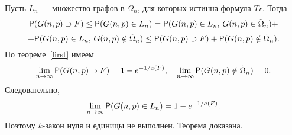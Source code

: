 \documentclass[12pt,a4paper,russian,titlepage]{article}
\begin{document}





Пусть $L_n$ --- множество графов в $\Omega_n$, для которых истинна формула $Tr$. Тогда
$$
 {\sf P}(G(n,p)\supset F)\leq {\sf P}(G(n,p)\in L_n)=
 {\sf P}(G(n,p)\in L_n,\,G(n,p)\in\tilde\Omega_n)+
$$
$$
 +{\sf P}(G(n,p)\in L_n,\,G(n,p)\notin\tilde\Omega_n)\leq
 {\sf P}(G(n,p)\supset F)+
 {\sf P}(G(n,p)\notin\tilde\Omega_n).
$$
По теореме~\ref{first} имеем
$$
 \lim\limits_{n\rightarrow\infty}{\sf P}(G(n,p)\supset F)=1 - e^{-1/a(F)},\quad
 \lim\limits_{n\rightarrow\infty}{\sf P}(G(n,p)\notin\tilde\Omega_n)=0.
$$
Следовательно,
$$
\lim\limits_{n\rightarrow\infty}{\sf P}(G(n,p)\in L_n) = 1 - e^{-1/a(F)}.
$$
Поэтому $k$-закон нуля и единицы не выполнен. Теорема доказана.
\end{document}
